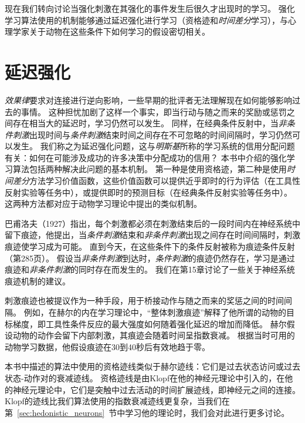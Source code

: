 现在我们转向讨论当强化刺激在其强化的事件发生后很久才出现时的学习。
强化学习算法使用的机制能够通过延迟强化进行学习（资格迹和\textit{时间差分}学习），与心理学家关于动物在这些条件下如何学习的假设密切相关。


\section{延迟强化} \label{sec:delayed_reinforcement}


\textit{效果律}要求对连接进行逆向影响，一些早期的批评者无法理解现在如何能够影响过去的事情。
这种担忧加剧了这样一个事实，即当行动与随之而来的奖励或惩罚之间存在相当大的延迟时，学习仍然可以发生。
同样，在经典条件反射中，当\textit{非条件刺激}出现时间与\textit{条件刺激}结束时间之间存在不可忽略的时间间隔时，学习仍然可以发生。
我们称之为延迟强化问题，这与\textit{明斯基}\cite{minsky1961steps}所称的学习系统的信用分配问题有关：如何在可能涉及成功的许多决策中分配成功的信用？
本书中介绍的强化学习算法包括两种解决此问题的基本机制。
第一种是使用资格迹，第二种是使用\textit{时间差分}方法学习价值函数，这些价值函数可以提供近乎即时的行为评估（在工具性反射实验等任务中），或提供即时的预测目标（在经典条件反射实验等任务中）。
这两种方法都对应于动物学习理论中提出的类似机制。


巴甫洛夫（1927）指出，每个刺激都必须在刺激结束后的一段时间内在神经系统中留下痕迹，他提出，当\textit{条件刺激}结束和\textit{非条件刺激}出现之间存在时间间隔时，刺激痕迹使学习成为可能。
直到今天，在这些条件下的条件反射被称为痕迹条件反射（第285页）。
假设当\textit{非条件刺激}到达时，\textit{条件刺激}的痕迹仍然存在，学习是通过痕迹和\textit{非条件刺激}的同时存在而发生的。
我们在第15章讨论了一些关于神经系统痕迹机制的建议。


刺激痕迹也被提议作为一种手段，用于桥接动作与随之而来的奖惩之间的时间间隔。
例如，在赫尔的内在学习理论中，“整体刺激痕迹”解释了他所谓的动物的目标梯度，即工具性条件反应的最大强度如何随着强化延迟的增加而降低\cite{hull1932goal,hull1943principles}。
赫尔假设动物的动作会留下内部刺激，其痕迹会随着时间呈指数衰减。
根据当时可用的动物学习数据，他假设痕迹在30到40秒后有效地趋于零。




本书中描述的算法中使用的资格迹线类似于赫尔迹线：它们是过去状态访问或过去状态-动作对的衰减迹线。
资格迹线是由Klopf\cite{klopf1972brain}在他的神经元理论中引入的，在他的神经元理论中，它们是突触中过去活动的时间扩展迹线，即神经元之间的连接。
Klopf的迹线比我们算法使用的指数衰减迹线更复杂，当我们在第~\ref{sec:hedonistic_neurons}~节中学习他的理论时，我们会对此进行更多讨论。


